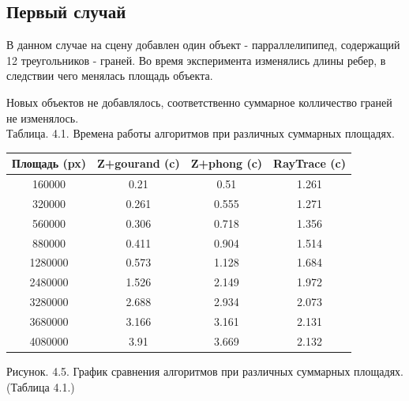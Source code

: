 \documentclass[12pt]{report}
\begin{document}
	\subsection{Первый случай}
	
	В данном случае на сцену добавлен один объект - парраллелипипед, содержащий 12 треугольников - граней.
	Во время эксперимента изменялись длины ребер, в следствии чего менялась площадь объекта.
	
	Новых объектов не добавлялось, соответственно суммарное колличество граней не изменялось.
	~\\	
	
	Таблица. 4.1. Времена работы алгоритмов при различных суммарных площадях.
	
	\begin{center}
		\begin{tabular}{|c c c c|}
			\hline
			Площадь (px) & Z+gourand (c) & Z+phong (c) & RayTrace (c) \\ [0.5ex]
			\hline
			160000 & 0.21 & 0.51 & 1.261 \\ 
			\hline 
			320000 & 0.261 & 0.555 & 1.271 \\ 
			\hline 
			560000 & 0.306 & 0.718 & 1.356 \\ 
			\hline 
			880000 & 0.411 & 0.904 & 1.514 \\ 
			\hline 
			1280000 & 0.573 & 1.128 & 1.684 \\ 
			\hline 
			2480000 & 1.526 & 2.149 & 1.972 \\ 
			\hline 
			3280000 & 2.688 & 2.934 & 2.073 \\
			\hline
			3680000 & 3.166 & 3.161 & 2.131 \\
			\hline
			4080000 & 3.91 & 3.669 & 2.132 \\
			\hline 
		\end{tabular}
	\end{center}

	\begin{center}
		\begin{center}
		\end{center}
		Рисунок. 4.5. График сравнения алгоритмов при различных суммарных площадях. (Таблица 4.1.)
	\end{center}
\end{document}

